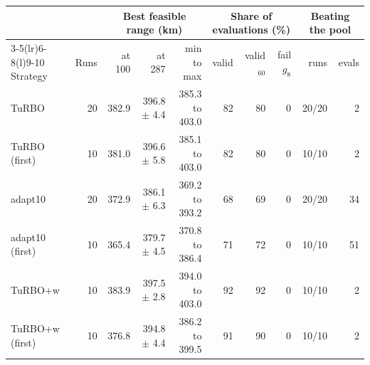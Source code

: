\begin{tabular*}{\linewidth}{@{\extracolsep{\fill}}lrrrrrrrrr@{}}
\toprule
 & & \multicolumn{3}{c}{Best feasible range (km)} & \multicolumn{3}{c}{Share of evaluations (\%)} & \multicolumn{2}{c}{Beating the pool} \\
\cmidrule(lr){3-5}\cmidrule(lr){6-8}\cmidrule(l){9-10}
Strategy & Runs & at 100 & at 287 & min to max & valid & valid$_{60}$ & fail $g_8$ & runs & evals \\
\midrule
TuRBO & 20 & 382.9 & 396.8 $\pm$ 4.4 & 385.3 to 403.0 & 82 & 80 & 0 & 20/20 & 2 \\
TuRBO (first) & 10 & 381.0 & 396.6 $\pm$ 5.8 & 385.1 to 403.0 & 82 & 80 & 0 & 10/10 & 2 \\
adapt10 & 20 & 372.9 & 386.1 $\pm$ 6.3 & 369.2 to 393.2 & 68 & 69 & 0 & 20/20 & 34 \\
adapt10 (first) & 10 & 365.4 & 379.7 $\pm$ 4.5 & 370.8 to 386.4 & 71 & 72 & 0 & 10/10 & 51 \\
TuRBO+w & 10 & 383.9 & 397.5 $\pm$ 2.8 & 394.0 to 403.0 & 92 & 92 & 0 & 10/10 & 2 \\
TuRBO+w (first) & 10 & 376.8 & 394.8 $\pm$ 4.4 & 386.2 to 399.5 & 91 & 90 & 0 & 10/10 & 2 \\
\bottomrule
\end{tabular*}

